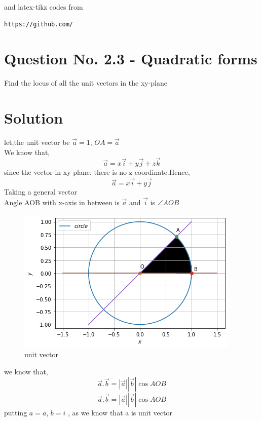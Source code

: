 \documentclass[journal,12pt,twocolumn]{IEEEtran}
\begin{document}
%
and latex-tikz codes from
%
\begin{lstlisting}
https://github.com/
\end{lstlisting}
\section{Question No. 2.3 - Quadratic forms}
Find the locus of all the unit vectors in the
xy-plane%
\section{Solution}
% 
let,the unit vector be $\vec{a}=1$, $OA= \vec{a}$ \\
%
We know that,
%
\begin{equation}
\vec{a} = x\vec{i}+y\vec{j}+z\vec{k}
\end{equation}
%
since the vector in xy plane, there is no z-coordinate.Hence,
%
\begin{equation}
\vec{a} = x\vec{i}+y\vec{j}
\end{equation}
%
Taking a general vector\\
Angle AOB with x-axis in between is  $\vec{a}$ and $\vec{i}$ is $\angle{AOB}$
%
\begin{figure}[!h]
\centering
\includegraphics[width= \columnwidth]{figure2.png}
\caption{unit vector}
\label{Figure}
\end{figure}
%
we know that,
%
\begin{equation}
\vec{a}.\vec{b} = |\vec{a}||\vec{b}|\cos{AOB}
\end{equation}
%
\begin{equation}
\vec{a}.\vec{b} = |\vec{a}||\vec{b}|\cos{AOB}
\end{equation}
%
putting $a=a$, $b=i$ , as we know that a is unit vector
\end{document}
